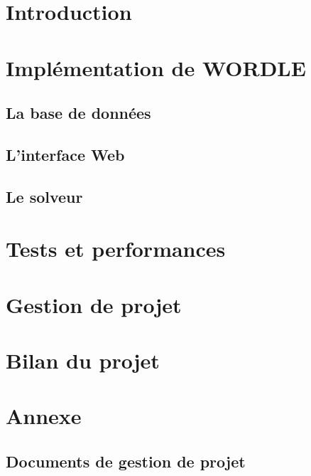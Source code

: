 \documentclass{article}
\begin{document}
\maketitle


\section{Introduction}


\newpage
\section{Implémentation de WORDLE}

\subsection{La base de données}


\newpage 
\subsection{L'interface Web}


\subsection{Le solveur}


\newpage
\section{Tests et performances}


\newpage
\section{Gestion de projet}


\newpage

\section{Bilan du projet}


\newpage
\section{Annexe}

\subsection{Documents de gestion de projet}

\end{document}
